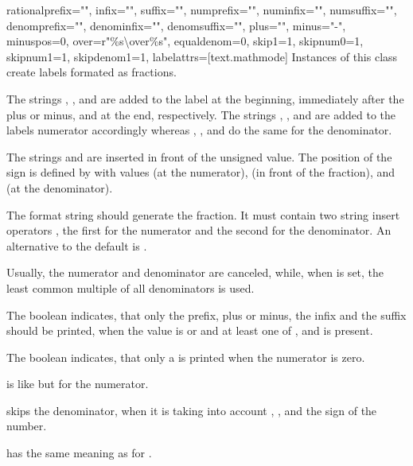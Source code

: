 \begin{classdesc}{rational}{prefix="", infix="", suffix="",
                            numprefix="", numinfix="", numsuffix="",
                            denomprefix="", denominfix="", denomsuffix="",
                            plus="", minus="-", minuspos=0, over=r"{{\%s}\textbackslash over{\%s}}",
                            equaldenom=0, skip1=1, skipnum0=1, skipnum1=1, skipdenom1=1,
                            labelattrs=[text.mathmode]}
  Instances of this class create labels formated as fractions.

  The strings , , and  are added to
  the label at the beginning, immediately after the plus or minus, and at
  the end, respectively. The strings ,
  , and  are added to the labels
  numerator accordingly whereas , ,
  and  do the same for the denominator.

  The strings  and  are inserted in front of the
  unsigned value. The position of the sign is defined by
   with values  (at the numerator), 
  (in front of the fraction), and  (at the denominator).

  The format string  should generate the fraction. It
  must contain two string insert operators , the first for
  the numerator and the second for the denominator. An alternative to
  the default is .

  Usually, the numerator and denominator are canceled, while, when
   is set, the least common multiple of all
  denominators is used.

  The boolean  indicates, that only the prefix, plus or minus,
  the infix and the suffix should be printed, when the value is
   or  and at least one of , 
  and  is present.

  The boolean  indicates, that only a  is
  printed when the numerator is zero.

   is like  but for the numerator.

   skips the denominator, when it is  taking
  into account , , 
   and the sign of the number.

   has the same meaning as for .
\end{classdesc}

